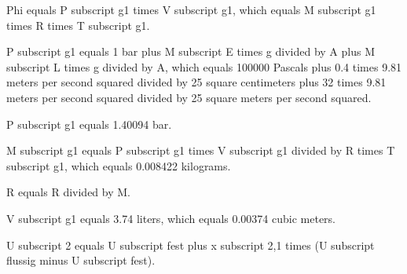 Phi equals P subscript g1 times V subscript g1, which equals M subscript g1 times R times T subscript g1.

P subscript g1 equals 1 bar plus M subscript E times g divided by A plus M subscript L times g divided by A, which equals 100000 Pascals plus 0.4 times 9.81 meters per second squared divided by 25 square centimeters plus 32 times 9.81 meters per second squared divided by 25 square meters per second squared.

P subscript g1 equals 1.40094 bar.

M subscript g1 equals P subscript g1 times V subscript g1 divided by R times T subscript g1, which equals 0.008422 kilograms.

R equals R divided by M.

V subscript g1 equals 3.74 liters, which equals 0.00374 cubic meters.

U subscript 2 equals U subscript fest plus x subscript 2,1 times (U subscript flussig minus U subscript fest).